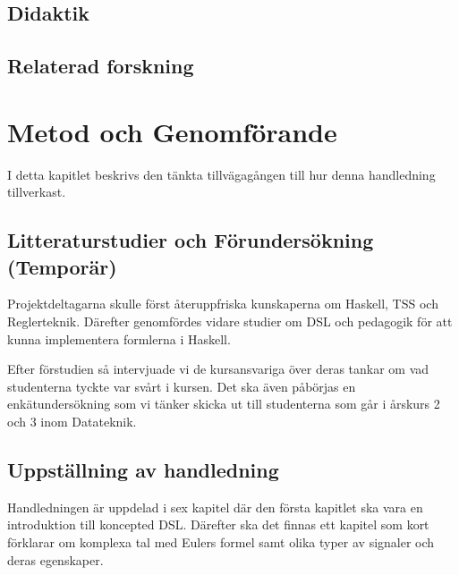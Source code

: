 \documentclass[]{article}
\begin{document}
\subsection{Didaktik}

\subsection{Relaterad forskning}


\section{Metod och Genomförande}



I detta kapitlet beskrivs den tänkta tillvägagången till hur denna
handledning tillverkast.

\subsection{Litteraturstudier och Förundersökning (Temporär)}


Projektdeltagarna skulle först återuppfriska kunskaperna om Haskell, TSS
och Reglerteknik. Därefter genomfördes vidare studier om DSL och pedagogik för
att kunna implementera formlerna i Haskell.

Efter förstudien så intervjuade vi de kursansvariga över deras tankar om vad
studenterna tyckte var svårt i kursen. Det ska även påbörjas en enkätundersökning
som vi tänker skicka ut till studenterna som går i årskurs 2 och 3 inom Datateknik.


\subsection{Uppställning av handledning}


Handledningen är uppdelad i sex kapitel %
där den första kapitlet ska vara en introduktion till koncepted DSL. Därefter ska det finnas
ett kapitel som kort förklarar om komplexa tal med Eulers formel samt olika typer av
signaler och deras egenskaper.
\end{document}
